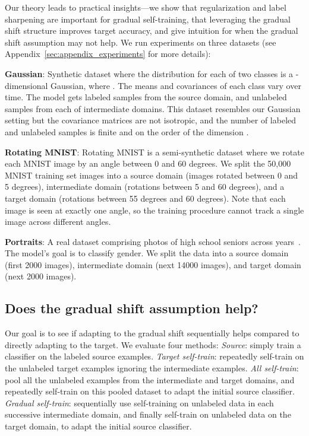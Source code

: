 \documentclass[11pt]{article}
\begin{document}
Our theory leads to practical insights---we show that regularization and label sharpening are important for gradual self-training, that leveraging the gradual shift structure improves target accuracy, and give intuition for when the gradual shift assumption may not help.
We run experiments on three datasets (see Appendix~\ref{sec:appendix_experiments} for more details):


\textbf{Gaussian}: Synthetic dataset where the distribution  for each of two classes is a -dimensional Gaussian, where . The means and covariances of each class vary over time. The model gets  labeled samples from the source domain, and  unlabeled samples from each of  intermediate domains. This dataset resembles our Gaussian setting but the covariance matrices are not isotropic, and the number of labeled and unlabeled samples is finite and on the order of the dimension .

\textbf{Rotating MNIST}: Rotating MNIST is a semi-synthetic dataset where we rotate each MNIST image by an angle between 0 and 60 degrees. We split the 50,000 MNIST training set images into a source domain (images rotated between 0 and 5 degrees), intermediate domain (rotations between 5 and 60 degrees), and a target domain (rotations between 55 degrees and 60 degrees). Note that each image is seen at exactly one angle, so the training procedure cannot track a single image across different angles.


\textbf{Portraits}: A real dataset comprising photos of high school seniors across years~\cite{ginosar2017portraits}. The model's goal is to classify gender. We split the data into a source domain (first 2000 images), intermediate domain (next 14000 images), and target domain (next 2000 images).

\subsection{Does the gradual shift assumption help?}
\label{sec:doesGradualShiftHelpExperiments}

Our goal is to see if adapting to the gradual shift sequentially helps compared to directly adapting to the target. We evaluate four methods: \emph{Source}: simply train a classifier on the labeled source examples. \emph{Target self-train}: repeatedly self-train on the unlabeled target examples ignoring the intermediate examples. \emph{All self-train}: pool all the unlabeled examples from the intermediate and target domains, and repeatedly self-train on this pooled dataset to adapt the initial source classifier. \emph{Gradual self-train}: sequentially use self-training on unlabeled data in each successive intermediate domain, and finally self-train on unlabeled data on the target domain, to adapt the initial source classifier.
\end{document}

